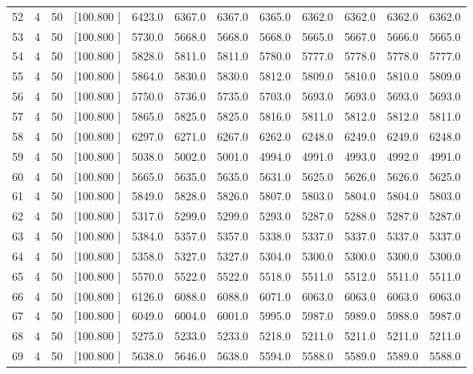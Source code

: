 \documentclass[12pt,a4paper]{article}
\begin{document}
\begin{center}
{\begin{tabular}{r r r r r r r r r r r r}
  52&  4& 50&[100.800   ]&  6423.0&  6367.0&  6367.0&  6365.0&  6362.0&  6362.0&  6362.0&  6362.0\\[-0.02in]
  53&  4& 50&[100.800   ]&  5730.0&  5668.0&  5668.0&  5668.0&  5665.0&  5667.0&  5666.0&  5665.0\\[-0.02in]
  54&  4& 50&[100.800   ]&  5828.0&  5811.0&  5811.0&  5780.0&  5777.0&  5778.0&  5778.0&  5777.0\\[-0.02in]
  55&  4& 50&[100.800   ]&  5864.0&  5830.0&  5830.0&  5812.0&  5809.0&  5810.0&  5810.0&  5809.0\\[-0.02in]
  56&  4& 50&[100.800   ]&  5750.0&  5736.0&  5735.0&  5703.0&  5693.0&  5693.0&  5693.0&  5693.0\\[-0.02in]
  57&  4& 50&[100.800   ]&  5865.0&  5825.0&  5825.0&  5816.0&  5811.0&  5812.0&  5812.0&  5811.0\\[-0.02in]
  58&  4& 50&[100.800   ]&  6297.0&  6271.0&  6267.0&  6262.0&  6248.0&  6249.0&  6249.0&  6248.0\\[-0.02in]
  59&  4& 50&[100.800   ]&  5038.0&  5002.0&  5001.0&  4994.0&  4991.0&  4993.0&  4992.0&  4991.0\\[-0.02in]
  60&  4& 50&[100.800   ]&  5665.0&  5635.0&  5635.0&  5631.0&  5625.0&  5626.0&  5626.0&  5625.0\\[-0.02in]
  61&  4& 50&[100.800   ]&  5849.0&  5828.0&  5826.0&  5807.0&  5803.0&  5804.0&  5804.0&  5803.0\\[-0.02in]
  62&  4& 50&[100.800   ]&  5317.0&  5299.0&  5299.0&  5293.0&  5287.0&  5288.0&  5287.0&  5287.0\\[-0.02in]
  63&  4& 50&[100.800   ]&  5384.0&  5357.0&  5357.0&  5338.0&  5337.0&  5337.0&  5337.0&  5337.0\\[-0.02in]
  64&  4& 50&[100.800   ]&  5358.0&  5327.0&  5327.0&  5304.0&  5300.0&  5300.0&  5300.0&  5300.0\\[-0.02in]
  65&  4& 50&[100.800   ]&  5570.0&  5522.0&  5522.0&  5518.0&  5511.0&  5512.0&  5511.0&  5511.0\\[-0.02in]
  66&  4& 50&[100.800   ]&  6126.0&  6088.0&  6088.0&  6071.0&  6063.0&  6063.0&  6063.0&  6063.0\\[-0.02in]
  67&  4& 50&[100.800   ]&  6049.0&  6004.0&  6001.0&  5995.0&  5987.0&  5989.0&  5988.0&  5987.0\\[-0.02in]
  68&  4& 50&[100.800   ]&  5275.0&  5233.0&  5233.0&  5218.0&  5211.0&  5211.0&  5211.0&  5211.0\\[-0.02in]
  69&  4& 50&[100.800   ]&  5638.0&  5646.0&  5638.0&  5594.0&  5588.0&  5589.0&  5589.0&  5588.0\\[-0.02in]

\end{tabular}}
\end{center}
\end{document}
